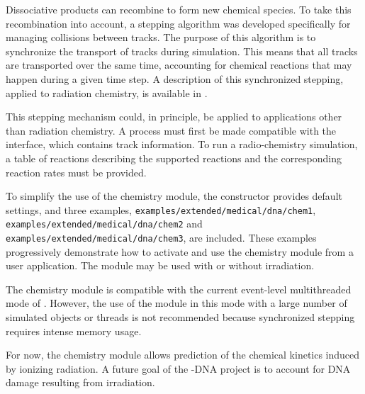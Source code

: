 Dissociative products can recombine to form new chemical species. To take this 
recombination into account, a stepping algorithm was developed specifically for 
managing collisions between \Gfour{} tracks.  The purpose of this algorithm is 
to synchronize the transport of tracks during simulation.  This means that all 
tracks are transported over the same time, accounting for chemical reactions 
that may happen during a given time step. A description of this synchronized 
stepping, applied to radiation chemistry, is available 
in \cite{embib:dna3,embib:chem:these}.

This stepping mechanism could, in principle, be applied to applications other
than radiation chemistry.  A process must first be made compatible with the 
 interface, which contains track information.  To run a 
radio-chemistry simulation, a table of reactions describing the supported 
reactions and the corresponding reaction rates must be provided.

To simplify the use of the chemistry module, the 
 constructor provides default settings,
and three examples, 
\verb"examples/extended/medical/dna/chem1", 
\verb"examples/extended/medical/dna/chem2" and
\verb"examples/extended/medical/dna/chem3", are included.  These examples 
progressively demonstrate how to activate and use the chemistry module from a
user application. The module may be used with or without irradiation.

The chemistry module is compatible with the current event-level multithreaded 
mode of \Gfour{}.  However, the use of the module in this mode with a large number
of simulated objects or threads is not recommended because synchronized stepping
requires intense memory usage.

For now, the chemistry module allows prediction of the chemical kinetics induced 
by ionizing radiation. A future goal of the \Gfour{}-DNA project is to account for
DNA damage resulting from irradiation. 
